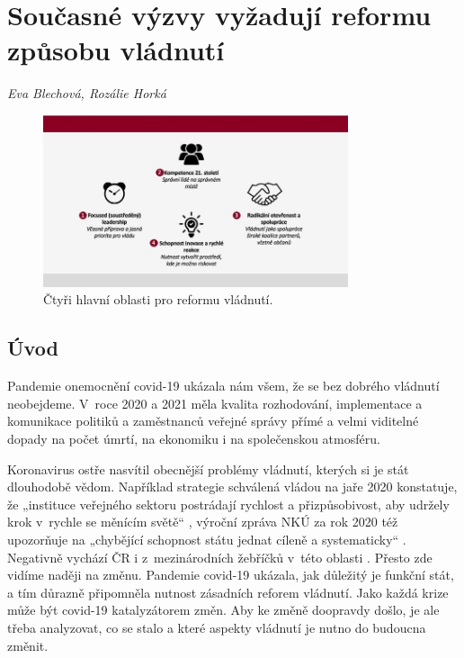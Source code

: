 
\chapter[Současné výzvy vyžadují reformu vládnutí]{Současné výzvy vyžadují reformu způsobu vládnutí}
\label{Nove_vyzvy}

\textit{Eva Blechová, Rozálie Horká}
\vspace{15mm}

\begin{figure}
    \centering
    \includegraphics[width=0.8\textwidth]{pic/evaschema.jpg}
    \caption{Čtyři hlavní oblasti pro reformu vládnutí.}
    \label{fig:ctyrioblasti}
\end{figure}

\section*{Úvod} 

Pandemie onemocnění covid-19 ukázala nám všem, že se bez dobrého vládnutí neobejdeme. V~roce 2020 a 2021 měla kvalita rozhodování, implementace a komunikace politiků a zaměstnanců veřejné správy přímé a velmi viditelné dopady na počet úmrtí, na ekonomiku i na společenskou atmosféru.

Koronavirus ostře nasvítil obecnější problémy vládnutí, kterých si je stát dlouhodobě vědom. Například strategie  schválená vládou na jaře 2020 konstatuje, že „instituce veřejného sektoru postrádají rychlost a přizpůsobivost, aby udržely krok v~rychle se měnícím světě“ \cite{ministerstvo_pro_mistni_rozvoj_cr_ministerstvo_2020}, výroční zpráva NKÚ za rok 2020 též upozorňuje na „chybějící schopnost státu jednat cíleně a systematicky“ \cite{nejvyssi-kontrolni-urad_vyrocni_2020}. Negativně vychází ČR i z~mezinárodních žebříčků v~této oblasti \cite{wef_global_2019}. Přesto zde vidíme naději na změnu. Pandemie covid-19 ukázala, jak důležitý je funkční stát, a tím důrazně připomněla nutnost zásadních reforem vládnutí. Jako každá krize může být covid-19 katalyzátorem změn. Aby ke změně doopravdy došlo, je ale třeba analyzovat, co se stalo a které aspekty vládnutí je nutno do budoucna změnit.


